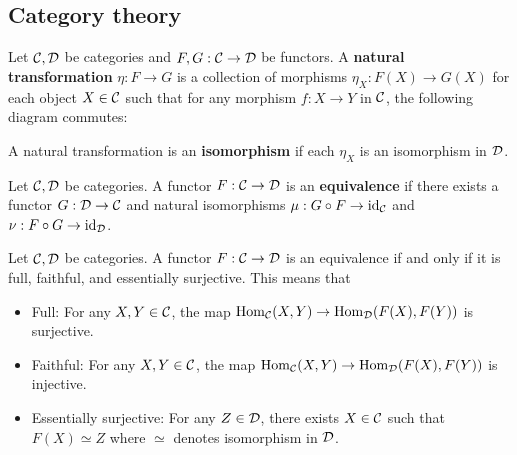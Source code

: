 \documentclass[12pt]{article}
\begin{document}
\subsection{Category theory}
\begin{definition}
    Let $\cal C, \cal D$ be categories and $F,G: \cal C \to \cal D$ be functors. A \textbf{natural transformation} $\eta: F \to G$ is a collection of morphisms $\eta_X: F(X) \to G(X)$ for each object $X \in \cal C$ such that for any morphism $f: X \to Y$ in $\cal C$, the following diagram commutes:
    \begin{center}
    \end{center}
    A natural transformation is an \textbf{isomorphism} if each $\eta_X$ is an isomorphism in $\cal D$.
\end{definition}

\begin{definition}
    Let $\cal C, \cal D$ be categories. A functor $F: \cal C \to \cal D$ is an \textbf{equivalence} if there exists a functor $G: \cal D \to \cal C$ and natural isomorphisms $\mu: G \circ F \to \text{id}_{\cal C}$ and $\nu: F \circ G \to \text{id}_{\cal D}$.
\end{definition}

\begin{proposition}
    Let $\cal C, \cal D$ be categories. A functor $F: \cal C \to \cal D$ is an equivalence if and only if it is full, faithful, and essentially surjective. This means that \begin{itemize}
        \item Full: For any $X,Y \in \cal C$, the map $\operatorname{Hom}_{\cal C}(X,Y) \to \operatorname{Hom}_{\cal D}(F(X), F(Y))$ is surjective.
        \item Faithful: For any $X,Y \in \cal C$, the map $\operatorname{Hom}_{\cal C}(X,Y) \to \operatorname{Hom}_{\cal D}(F(X), F(Y))$ is injective.
        \item Essentially surjective: For any $Z \in \cal D$, there exists $X \in \cal C$ such that $F(X) \simeq Z$ where $\simeq$ denotes isomorphism in $\cal D$.
    \end{itemize}
\end{proposition}
\end{document}
